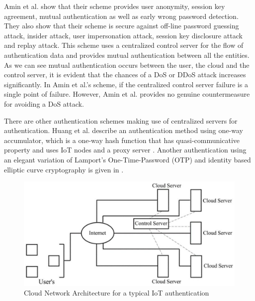 \begin{multicols}{2}
Amin et al. show that their scheme provides user anonymity, session key agreement, mutual authentication as well as early wrong password detection. They also show that their scheme is secure against off-line password guessing attack, insider attack, user impersonation attack, session key disclosure attack and replay attack. This scheme uses a centralized control server for the flow of authentication data and provides mutual authentication between all the entities. As we can see mutual authentication occurs between the user, the cloud and the control server, it is evident that the chances of a DoS or DDoS attack increases significantly. In Amin et al.'s scheme, if the centralized control server failure is a single point of failure. However, Amin et al. provides no genuine countermeasure for avoiding a DoS attack.

There are other authentication schemes making use of centralized servers for authentication. Huang et al. describe an authentication method using one-way accumulator, which is a one-way hash function that has quasi-communicative property and uses IoT nodes and a proxy server \cite{chap2-key22}. Another authentication using an elegant variation of Lamport's One-Time-Password (OTP) and identity based elliptic curve cryptography is given in \cite{chap2-key22}.
\end{multicols}

\begin{figure}[!ht]
\centering
\includegraphics[scale=.77]{src/Figures/chap2/6.eps}
\caption{Cloud Network Architecture for a typical IoT authentication}\label{chap2-fig6}
\end{figure}

\medskip


